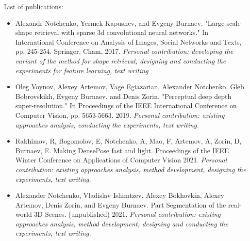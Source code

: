 \documentclass[a4paper, 11pt, oneside]{Thesis}  %
\begin{document}
\clearpage  %

{\large
 List of publications:}


\begin{itemize}
    \item
    Alexandr Notchenko, Yermek Kapushev, and Evgeny Burnaev. "Large-scale shape retrieval with sparse 3d convolutional neural networks." In International Conference on Analysis of Images, Social Networks and Texts, pp. 245-254. Springer, Cham, 2017.
    \textit{Personal contribution: developing the variant of the method for shape retrieval, designing and conducting the experiments for feature learning, text writing}

    \item
    Oleg Voynov, Alexey Artemov, Vage Egiazarian, Alexander Notchenko, Gleb Bobrovskikh, Evgeny Burnaev, and Denis Zorin. "Perceptual deep depth super-resolution." In Proceedings of the IEEE International Conference on Computer Vision, pp. 5653-5663. 2019.
    \textit{Personal contribution: existing approaches analysis, conducting the experiments, text writing.}
    
    \item
    Rakhimov, R, Bogomolov, E, Notchenko, A, Mao, F, Artemov, A, Zorin, D, Burnaev, E. Making DensePose fast and light. Proceedings of the IEEE Winter Conference on Applications of Computer Vision 2021.
    \textit{Personal contribution: existing approaches analysis, method development, designing the experiments, text writing.}

    \item 
    Alexander Notchenko, Vladislav Ishimtzev, Alexey Bokhovkin, Alexey Artemov, Denis Zorin, and Evgeny Burnaev. Part Segmentation of the real-world 3D Scenes. (unpublished) 2021.
    \textit{Personal contribution: existing approaches analysis, method development, designing and conducting the experiments, text writing.}
\end{itemize}


\clearpage
{}  %
\end{document}
